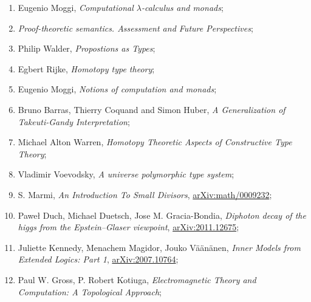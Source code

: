 \documentclass[a4paper,11pt]{article}
\begin{document}
\begin{enumerate}
\item Eugenio Moggi, \textit{Computational $\lambda$-calculus and monads};



\item \textit{Proof-theoretic semantics. Assessment and Future
    Perspectives};



\item Philip Walder, \textit{Propostions as Types};



\item Egbert Rijke, \textit{Homotopy type theory};



\item Eugenio Moggi, \textit{Notions of computation and monads};



\item Bruno Barras, Thierry Coquand and Simon Huber, \textit{A
    Generalization of Takeuti-Gandy Interpretation};



\item Michael Alton Warren, \textit{Homotopy Theoretic Aspects of
    Constructive Type Theory};



\item Vladimir Voevodsky, \textit{A universe polymorphic type system};



\item S. Marmi, \textit{An Introduction To Small Divisors},
  \href{https://arxiv.org/abs/math/0009232v1}{arXiv:math/0009232};



\item Paweł Duch, Michael Duetsch, Jose M. Gracia-Bondia,
  \textit{Diphoton decay of the higgs from the Epstein--Glaser
    viewpoint},
  \href{https://arxiv.org/abs/2011.12675v2}{arXiv:2011.12675};



\item Juliette Kennedy, Menachem Magidor, Jouko V\"{a}\"{a}n\"{a}nen,
  \textit{Inner Models from Extended Logics: Part 1},
  \href{https://arxiv.org/abs/2007.10764}{arXiv:2007.10764};



\item Paul W. Gross, P. Robert Kotiuga, \textit{Electromagnetic Theory
    and Computation: A Topological Approach};




\end{enumerate}
\end{document}

